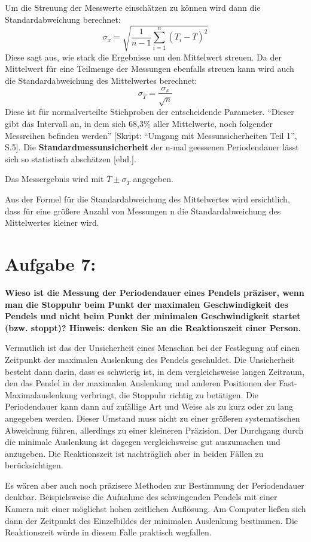 \documentclass[
]{article}
\begin{document}
Um die Streuung der Messwerte einschätzen zu können wird dann die
Standardabweichung berechnet:
\[\sigma_x = \sqrt{\frac{1}{n-1} \sum_{i=1}^n (T_i - \overline{T})^2}\]
Diese sagt aus, wie stark die Ergebnisse um den Mittelwert streuen. Da
der Mittelwert für eine Teilmenge der Messungen ebenfalls streuen kann
wird auch die Standardabweichung des Mittelwertes berechnet:
\[\sigma_{\overline{T}}=\frac{\sigma_x}{\sqrt{n}}\] Diese ist für
normalverteilte Stichproben der entscheidende Parameter. ``Dieser gibt
das Intervall an, in dem sich 68,3\% aller Mittelwerte, noch folgender
Messreihen befinden werden'' {[}Skript: ``Umgang mit Messunsicherheiten
Teil 1'', S.5{]}. Die \textbf{Standardmessunsicherheit} der n-mal
geessenen Periodendauer lässt sich so statistisch abschätzen {[}ebd.{]}.

Das Messergebnis wird mit \(\overline{T} \pm \sigma_{\overline{T}}\)
angegeben.

Aus der Formel für die Standardabweichung des Mittelwertes wird
ersichtlich, dass für eine größere Anzahl von Messungen n die
Standardabweichung des Mittelwertes kleiner wird.

\hypertarget{aufgabe-7}{%
\section{Aufgabe 7:}\label{aufgabe-7}}

\textbf{Wieso ist die Messung der Periodendauer eines Pendels präziser,
wenn man die Stoppuhr beim Punkt der maximalen Geschwindigkeit des
Pendels und nicht beim Punkt der minimalen Geschwindigkeit startet (bzw.
stoppt)? Hinweis: denken Sie an die Reaktionszeit einer Person.}

Vermutlich ist das der Unsicherheit eines Menschan bei der Festlegung
auf einen Zeitpunkt der maximalen Auslenkung des Pendels geschuldet. Die
Unsicherheit besteht dann darin, dass es schwierig ist, in dem
vergleichsweise langen Zeitraum, den das Pendel in der maximalen
Auslenkung und anderen Positionen der Fast-Maximalauslenkung verbringt,
die Stoppuhr richtig zu betätigen. Die Periodendauer kann dann auf
zufällige Art und Weise als zu kurz oder zu lang angegeben werden.
Dieser Umstand muss nicht zu einer größeren systematischen Abweichung
führen, allerdings zu einer kleineren Präzision. Der Durchgang durch die
minimale Auslenkung ist dagegen vergleichsweise gut auszumachen und
anzugeben. Die Reaktionszeit ist nachträglich aber in beiden Fällen zu
berücksichtigen.

Es wären aber auch noch präzisere Methoden zur Bestimmung der
Periodendauer denkbar. Beispielsweise die Aufnahme des schwingenden
Pendels mit einer Kamera mit einer möglichst hohen zeitlichen Auflösung.
Am Computer ließen sich dann der Zeitpunkt des Einzelbildes der
minimalen Auslenkung bestimmen. Die Reaktionszeit würde in diesem Falle
praktisch wegfallen.
\end{document}
